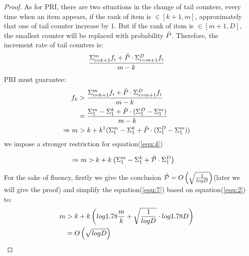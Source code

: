 {\begin{proof}
As for PRI, there are two situations in the change of tail counters, every time when an item appears, if the rank of item is $\in[k+1,m]$, approximately that one of tail counter increase by 1. But if the rank of item is $\in[m+1,D]$, the smallest counter will be replaced with probability $\Tilde{P}$.
Therefore, the increment rate of tail counters is:
\begin{equation}
\begin{aligned}
\centering  
    \frac{\Sigma_{i=k+1}^m{f_i}+\Tilde{P}\cdot\Sigma_{i=m+1}^D{f_i}}{m-k}
\end{aligned}
\end{equation}   
PRI must guarantee:
\begin{equation}
\begin{aligned}
\centering  
    f_k &> \frac{\Sigma_{i=k+1}^m{f_i}+\Tilde{P}\cdot\Sigma_{i=m+1}^D{f_i}}{m-k}\\
        &= \frac{\Sigma_1^m-\Sigma_1^k+\Tilde{P}\cdot(\Sigma_1^D-\Sigma_1^m)}{m-k}\\
    \Rightarrow m &> k + k^1(\Sigma_1^m-\Sigma_1^k+\Tilde{P}\cdot(\Sigma_1^D-\Sigma_1^m))
\end{aligned}
\end{equation}
we impose a stronger restriction for equation(\ref{equ:4}) 

\begin{equation}
\begin{aligned}
\centering 
\label{equ:7}
\Rightarrow m &> k + k\left(\Sigma_1^m-\Sigma_1^k+\Tilde{\mathcal{P}}\cdot\Sigma_1^D\right)
\end{aligned}
\end{equation}

For the sake of fluency, firstly we give the conclusion $\Tilde{\mathcal{P}}=O\left(\sqrt{\frac{1}{logD}}\right)$(later we will give the proof) and simplify the equation(\ref{equ:7}) based on equation(\ref{equ:2}) to:
\begin{equation}
\begin{aligned}
\centering  
m &> k + k\left(log1.78\frac{m}{k} + \sqrt{\frac{1}{logD}}\cdot log1.78D\right)\\ 
&= O\left(\sqrt{logD}\right)
\end{aligned}
\end{equation}


\end{proof}}
